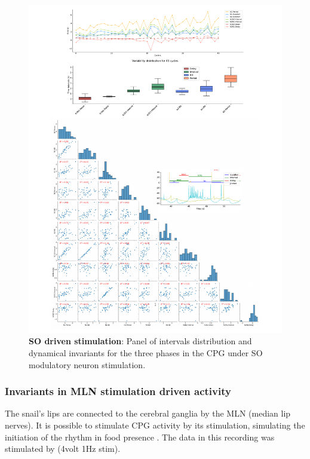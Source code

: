 \begin{figure}[htbp]
	\centering
	\includegraphics[width=1.1\textwidth]{./invariants/data/SUSSEX/SO_driven/images/panel_with_pairplot.pdf}
	\caption{\textbf{SO driven stimulation}: Panel of intervals distribution and dynamical invariants for the three phases in the CPG under SO modulatory neuron stimulation.}
	\label{fig:so stimulation pairplot}
\end{figure}



\subsubsection{Invariants in MLN stimulation driven activity}
The snail's lips are connected to the cerebral ganglia by the MLN (median lip nerves). It is possible to stimulate CPG activity by its stimulation, simulating the initiation of the rhythm in food presence \parencite{staras_electrophysiological_2019}. The data in this recording was stimulated by (4volt 1Hz stim).


